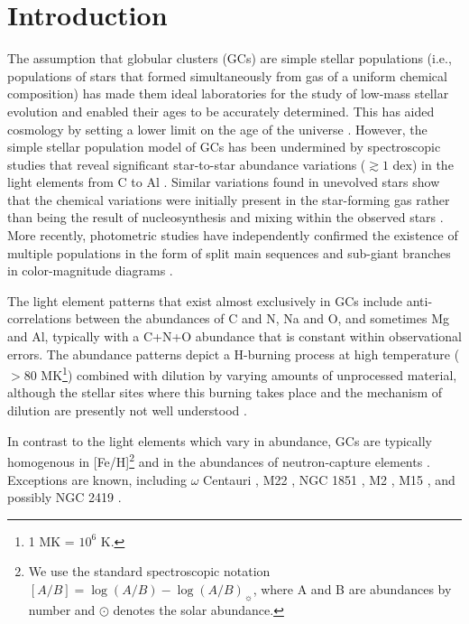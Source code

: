 \section{Introduction}
The assumption that globular clusters (GCs) are simple stellar populations (i.e., populations of stars that formed simultaneously from gas of a uniform chemical composition) has made them ideal laboratories for the study of low-mass stellar evolution \citep{Moehler:2001gc} and enabled their ages to be accurately determined. This has aided cosmology by setting a lower limit on the age of the universe \citep{Chaboyer:1996hh,Dotter:2010ek}. However, the simple stellar population model of GCs has been undermined by spectroscopic studies that reveal significant star-to-star abundance variations ($\gtrsim 1$ dex) in the light elements from C to Al \citep[e.g.,][]{Cottrell:1981ha,Carretta:2009kr,Denissenkov:2014bc}. Similar variations found in unevolved stars show that the chemical variations were initially present in the star-forming gas rather than being the result of nucleosynthesis and mixing within the observed stars \citep{Cannon:1998ki,Gratton:2001ew}. More recently, photometric studies have independently confirmed the existence of multiple populations in the form of split main sequences and sub-giant branches in color-magnitude diagrams \citep[e.g.,][]{Piotto:2007br,Piotto:2009ds,Milone:2008dz}.

The light element patterns that exist almost exclusively in GCs \citep[i.e., rarely in field stars and open clusters, see][]{Gratton:2000wg,DeSilva:2009ki} include anti-correlations between the abundances of C and N, Na and O, and sometimes Mg and Al, typically with a C+N+O abundance that is constant within observational errors. The abundance patterns depict a H-burning process at high temperature ($>80$ MK\footnote{1 MK = $10^6$ K.}) combined with dilution by varying amounts of unprocessed material, although the stellar sites where this burning takes place and the mechanism of dilution are presently not well understood \citep{Denisenkov:1990vz,Langer:1993dx,Decressin:2007bf,Prantzos:2007bs,DOrazi:2010kb,DErcole:2011jc}.

In contrast to the light elements which vary in abundance, GCs are typically homogenous in [Fe/H]\footnote{We use the standard spectroscopic notation $[A/B] = \log(A/B) - \log(A/B)_\sun$, where A and B are abundances by number and $\odot$ denotes the solar abundance.} \citep[$\sigma$\textless 0.05 dex,][]{Carretta:2009di} and in the abundances of neutron-capture elements \citep[$Z> 30$;][]{Gratton:2004dy,Yong:2006ia,Yong:2008in,DOrazi:2010fs}. Exceptions are known, including $\omega$ Centauri \citep{Norris:1995kc,Smith:2000cb,Johnson:2010fs}, M22 \citep{Marino:2009je}, NGC 1851 \citep{Yong:2008ja,Villanova:2010bi,Carretta:2011eo}, M2 \citep{Yong:2014dq}, M15 \citep{Sneden:1997fp,Sobeck:2011dv}, and possibly NGC 2419 \citep{Cohen:2012cd}.

